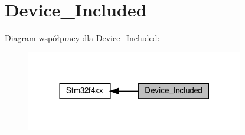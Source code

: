 \hypertarget{group___device___included}{}\section{Device\+\_\+\+Included}
\label{group___device___included}
Diagram współpracy dla Device\+\_\+\+Included\+:\nopagebreak
\begin{figure}[H]
\begin{center}
\leavevmode
\includegraphics[width=269pt]{group___device___included}
\end{center}
\end{figure}
